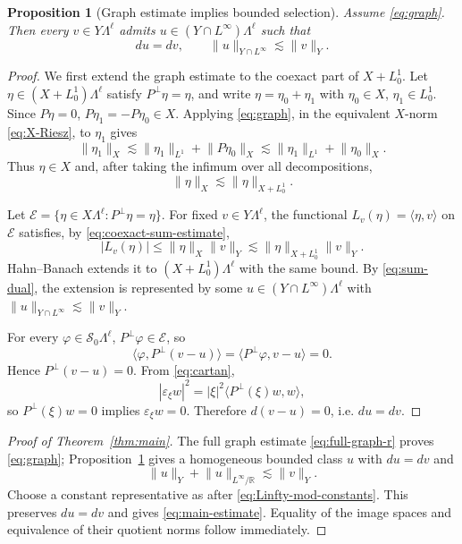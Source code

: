\documentclass[11pt]{amsart}
\numberwithin{equation}{section}
\newtheorem{proposition}[theorem]{Proposition}
\theoremstyle{definition}
\theoremstyle{remark}
\newcommand{\R}{\mathbb R}
\newcommand{\cS}{\mathcal S}
\newcommand{\eps}{\varepsilon}
\newcommand{\norm}[1]{\lVert #1\rVert}
\newcommand{\pair}[2]{\langle #1,#2\rangle}
\begin{document}
\begin{proposition}[Graph estimate implies bounded selection]\label{prop:graph-to-selection}
Assume \eqref{eq:graph}.  Then every $v\in Y\Lambda^\ell$ admits
$u\in(Y\cap L^\infty)\Lambda^\ell$ such that
\[
 du=dv,\qquad \norm u_{Y\cap L^\infty}\lesssim\norm v_Y.
\]
\end{proposition}

\begin{proof}
We first extend the graph estimate to the coexact part of
$X+L^1_0$.  Let $\eta\in(X+L^1_0)\Lambda^\ell$ satisfy
$P^\perp\eta=\eta$, and write $\eta=\eta_0+\eta_1$ with
$\eta_0\in X$, $\eta_1\in L^1_0$.  Since $P\eta=0$,
$P\eta_1=-P\eta_0\in X$.  Applying \eqref{eq:graph}, in the equivalent
$X$-norm \eqref{eq:X-Riesz}, to $\eta_1$ gives
\[
 \norm{\eta_1}_X
 \lesssim \norm{\eta_1}_{L^1}+\norm{P\eta_0}_X
 \lesssim \norm{\eta_1}_{L^1}+\norm{\eta_0}_X.
\]
Thus $\eta\in X$ and, after taking the infimum over all decompositions,
\begin{equation}\label{eq:coexact-sum-estimate}
 \norm\eta_X\lesssim\norm\eta_{X+L^1_0}.
\end{equation}

Let
$\mathcal E=\{\eta\in X\Lambda^\ell:P^\perp\eta=\eta\}$.
For fixed $v\in Y\Lambda^\ell$, the functional
$L_v(\eta)=\pair{\eta}{v}$ on $\mathcal E$ satisfies, by
\eqref{eq:coexact-sum-estimate},
\[
 |L_v(\eta)|
 \le\norm\eta_X\norm v_Y
 \lesssim\norm\eta_{X+L^1_0}\norm v_Y.
\]
Hahn--Banach extends it to $(X+L^1_0)\Lambda^\ell$ with the same bound.
By \eqref{eq:sum-dual}, the extension is represented by some
$u\in(Y\cap L^\infty)\Lambda^\ell$ with
$\norm u_{Y\cap L^\infty}\lesssim\norm v_Y$.

For every $\varphi\in\cS_0\Lambda^\ell$, $P^\perp\varphi\in\mathcal E$, so
\[
 \pair{\varphi}{P^\perp(v-u)}
 =\pair{P^\perp\varphi}{v-u}=0.
\]
Hence $P^\perp(v-u)=0$.  From \eqref{eq:cartan},
\[
 |\eps_\xi w|^2
 =|\xi|^2\pair{P^\perp(\xi)w}{w},
\]
so $P^\perp(\xi)w=0$ implies $\eps_\xi w=0$.  Therefore
$d(v-u)=0$, i.e. $du=dv$.
\end{proof}

\begin{proof}[Proof of Theorem~\ref{thm:main}]
The full graph estimate \eqref{eq:full-graph-r} proves \eqref{eq:graph};
Proposition~\ref{prop:graph-to-selection} gives a homogeneous bounded class
$u$ with $du=dv$ and
\[
 \norm u_Y+\norm u_{L^\infty/\R}\lesssim\norm v_Y.
\]
Choose a constant representative as after
\eqref{eq:Linfty-mod-constants}.  This preserves $du=dv$ and gives
\eqref{eq:main-estimate}.  Equality of the image spaces and equivalence of
their quotient norms follow immediately.
\end{proof}
\end{document}
